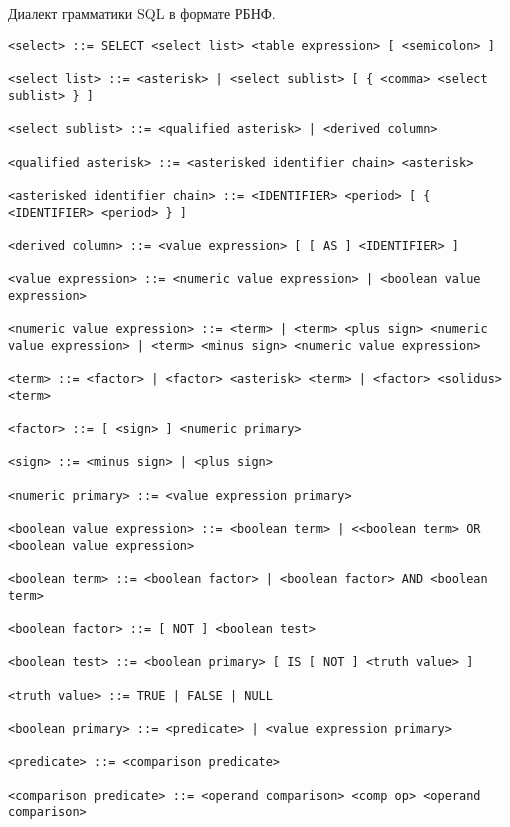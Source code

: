 \begin{appendices}
	\chapter{}
\end{appendices}

Диалект грамматики SQL в формате РБНФ.

\begin{lstlisting}[label=lst:dop_a,caption=диалект грамматики SQL в формате
РБНФ]
<select> ::= SELECT <select list> <table expression> [ <semicolon> ]

<select list> ::= <asterisk> | <select sublist> [ { <comma> <select sublist> } ]

<select sublist> ::= <qualified asterisk> | <derived column>

<qualified asterisk> ::= <asterisked identifier chain> <asterisk>

<asterisked identifier chain> ::= <IDENTIFIER> <period> [ { <IDENTIFIER> <period> } ]

<derived column> ::= <value expression> [ [ AS ] <IDENTIFIER> ]

<value expression> ::= <numeric value expression> | <boolean value expression> 

<numeric value expression> ::= <term> | <term> <plus sign> <numeric value expression> | <term> <minus sign> <numeric value expression>

<term> ::= <factor> | <factor> <asterisk> <term> | <factor> <solidus> <term>

<factor> ::= [ <sign> ] <numeric primary>

<sign> ::= <minus sign> | <plus sign>

<numeric primary> ::= <value expression primary>

<boolean value expression> ::= <boolean term> | <<boolean term> OR <boolean value expression>

<boolean term> ::= <boolean factor> | <boolean factor> AND <boolean term> 

<boolean factor> ::= [ NOT ] <boolean test>

<boolean test> ::= <boolean primary> [ IS [ NOT ] <truth value> ]

<truth value> ::= TRUE | FALSE | NULL

<boolean primary> ::= <predicate> | <value expression primary>

<predicate> ::= <comparison predicate>

<comparison predicate> ::= <operand comparison> <comp op> <operand comparison>


\end{lstlisting}
